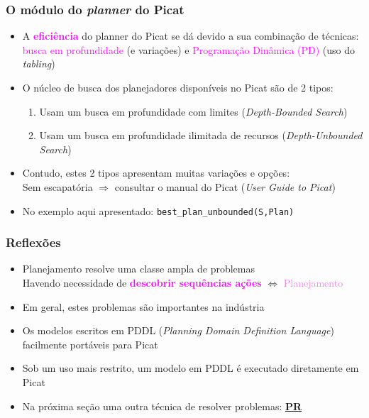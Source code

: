 \begin{frame}[fragile]
 \frametitle{O módulo do \textit{planner} do Picat}

\begin{itemize}

 \item A \textcolor{magenta}{\textbf{eficiência}} do planner do Picat se dá devido a sua combinação
       de técnicas: \textcolor{magenta}{busca em profundidade} (e variações) e \textcolor{magenta}{Programação
       Dinâmica (PD)} (uso do \textit{tabling})


  \pause 
  \item O núcleo de busca dos planejadores  disponíveis no Picat são de 2 tipos:
  \begin{enumerate}
    \item Usam um busca em profundidade com limites (\textit{Depth-Bounded Search})
    \item Usam um busca em profundidade ilimitada de recursos (\textit{Depth-Unbounded Search}) 
  \end{enumerate}
  
  \item Contudo, estes 2 tipos apresentam muitas variações e opções:\\
  \pause
  Sem escapatória $\Rightarrow $ consultar o manual do Picat (\textit{User Guide to Picat})
  
  \item No exemplo aqui apresentado: 
  \texttt{best\_plan\_unbounded(S,Plan)}   
\end{itemize}
\end{frame}




\begin{frame}[fragile]
\frametitle{Reflexões}


\begin{itemize}
  \item Planejamento resolve uma classe ampla de problemas\\
   Havendo necessidade de
    \textcolor{magenta}{\textbf{descobrir sequências ações}} $\Leftrightarrow$ \textcolor{violet}{Planejamento}

  \pause
  \item Em geral, estes problemas são importantes na indústria

  \pause
  \item Os modelos escritos em PDDL (\textit{Planning Domain Definition Language})
  facilmente portáveis para Picat
    \pause
  \item Sob um uso mais restrito, um modelo em PDDL é executado diretamente em Picat
    
  \pause
  \item Na próxima seção uma outra técnica de resolver problemas: \textbf{\underline{PR}}
\end{itemize}

\end{frame}

